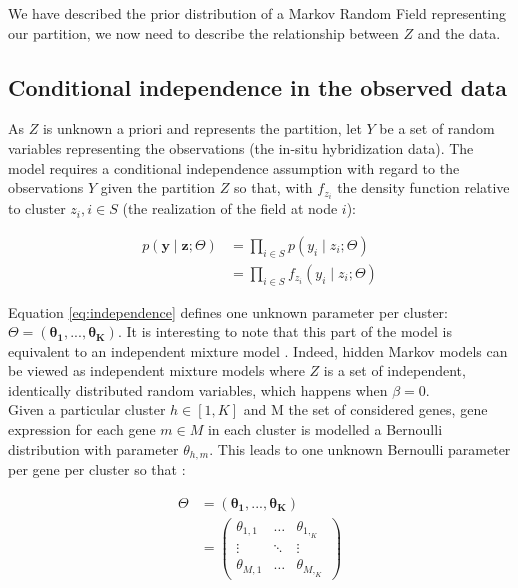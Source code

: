 We have described the prior distribution of a Markov Random Field representing our partition, we now need to describe the relationship between $Z$ and the data.

\subsection{Conditional independence in the observed data}
As $Z$ is unknown a priori and represents the partition, let $Y$ be a set of random variables representing the observations (the in-situ hybridization data). The model requires a conditional independence assumption with regard to the observations $Y$ given the partition $Z$ so that, with $f_{z_i}$ the density function relative to cluster $z_i, i \in S$ (the realization of the field at node $i$):

\begin{align}
p(\boldsymbol{y} \mid \boldsymbol{z} ; \Theta) &= \prod_{i \in S} p(y_i \mid z_i ; \Theta) \nonumber\\
\label{eq:independence}
&= \prod_{i \in S} f_{z_i} (y_i \mid z_i ; \Theta)
\end{align}

Equation \ref{eq:independence} defines one unknown parameter per cluster: $\Theta = (\boldsymbol{\theta_1},...,\boldsymbol{\theta_K})$. It is interesting to note that this part of the model is equivalent to an independent mixture model \cite{mclachlan04}. Indeed, hidden Markov models can be viewed as independent mixture models where $Z$ is a set of independent, identically distributed random variables, which happens when $\beta = 0$.\\

Given a particular cluster $h \in [1,K]$ and M the set of considered genes, gene expression for each gene $m \in M$ in each cluster is modelled a Bernoulli distribution with parameter $\theta_{h,m}$. This leads to one unknown Bernoulli parameter per gene per cluster so that :

\begin{align*}
\Theta &= (\boldsymbol{\theta_1},...,\boldsymbol{\theta_K})\\
&= \left( \begin{array} {ccc}
\theta_{1,1} & \ldots  & \theta_{1,_K}\\
\vdots & \ddots & \vdots\\
\theta_{M,1} & \ldots & \theta_{M,_K} \end{array} \right)
\end{align*}

